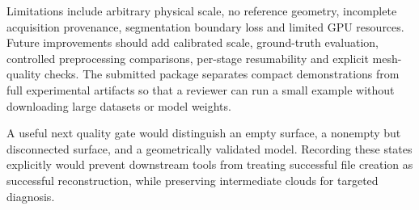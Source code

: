 \documentclass[conference]{IEEEtran}
\begin{document}
Limitations include arbitrary physical scale, no reference geometry, incomplete acquisition provenance, segmentation boundary loss and limited GPU resources. Future improvements should add calibrated scale, ground-truth evaluation, controlled preprocessing comparisons, per-stage resumability and explicit mesh-quality checks. The submitted package separates compact demonstrations from full experimental artifacts so that a reviewer can run a small example without downloading large datasets or model weights.

A useful next quality gate would distinguish an empty surface, a nonempty but disconnected surface, and a geometrically validated model. Recording these states explicitly would prevent downstream tools from treating successful file creation as successful reconstruction, while preserving intermediate clouds for targeted diagnosis.
\end{document}

